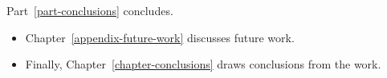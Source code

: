 \noindent Part~\ref{part-conclusions} %
concludes. 

\begin{itemize}
    \item Chapter~\ref{appendix-future-work} discusses future work. 
    \item Finally, Chapter~\ref{chapter-conclusions} draws conclusions from the work.
\end{itemize}



% 
